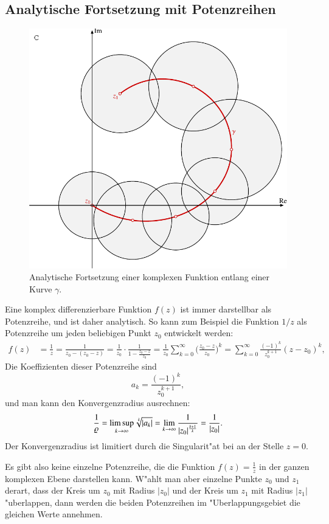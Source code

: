 \subsection{Analytische Fortsetzung mit Potenzreihen}
\begin{figure}
\centering
\includegraphics{chapters/images/komplex-1.pdf}
\caption{Analytische Fortsetzung einer komplexen Funktion entlang einer
Kurve $\gamma$.
\label{komplex:fortsetzung}}
\end{figure}
Eine komplex differenzierbare Funktion $f(z)$ ist immer darstellbar als
Potenzreihe, und ist daher analytisch.
So kann zum Beispiel die Funktion $1/z$ als Potenzreihe um jeden 
beliebigen Punkt $z_0$ entwickelt werden:
\begin{align}
f(z)
&=
\frac1z
=
\frac1{z_0-(z_0-z)}
=
\frac1{z_0}\cdot
\frac1{1-\displaystyle\frac{z_0-z}{z_0}}
=
\frac1{z_0}\sum_{k=0}^{\infty} \biggl(\frac{z_0-z}{z_0}\biggr)^k
=
\sum_{k=0}^{\infty} \frac{(-1)^k}{z_0^{k+1}} (z-z_0)^k,
\label{komplex:1durchreihe}
\end{align}
Die Koeffizienten dieser Potenzreihe sind
\[
a_k=\frac{(-1)^k}{z_0^{k+1}},
\]
und man kann den Konvergenzradius ausrechnen:
\[
\frac1{\varrho}
=
\limsup_{k\to\infty} \root{k}\of{|a_k|} = \lim_{k\to\infty}\frac1{|z_0|^{\frac{k+1}{k}}}
=
\frac1{|z_0|}.
\]
Der Konvergenzradius ist limitiert durch die Singularit"at bei an der Stelle
$z=0$.

Es gibt also keine einzelne Potenzreihe, die die Funktion $f(z)=\frac1z$ in der
ganzen komplexen Ebene darstellen kann.
W"ahlt man aber einzelne Punkte $z_0$ und $z_1$ derart, dass der Kreis
um $z_0$ mit Radius $|z_0|$ und der Kreis um $z_1$ mit Radius $|z_1|$
"uberlappen, dann werden die beiden Potenzreihen im "Uberlappungsgebiet
die gleichen Werte annehmen.

